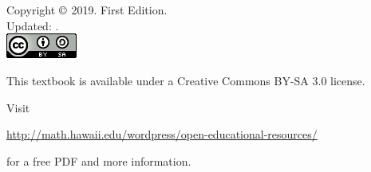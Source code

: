 \chapter*{}
\vfill

\noindent Copyright $\copyright$ 2019. First Edition. \\
Updated: \versiondate. \\

\noindent\includegraphics[width=.7in]{extraTex/preamble/88x31.png}

\noindent This textbook is available under a Creative Commons BY-SA 3.0 license.

\noindent Visit 

\noindent\url{http://math.hawaii.edu/wordpress/open-educational-resources/}

\noindent for a free PDF and more information.\\ %
\printlocation


